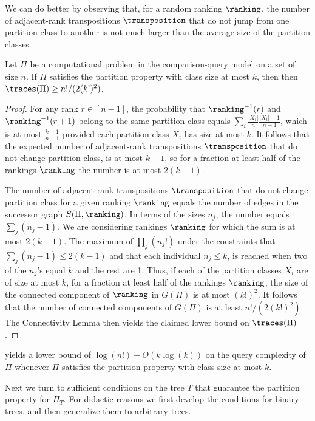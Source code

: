 We can do better by observing that, for a random ranking $\ranking$, the number of adjacent-rank transpositions $\transposition$ that do not jump from one partition class to another is not much larger than the average size of the partition classes.
\begin{lemma}\label{lemma:connectivity:sensitive}
Let $\Pi$ be a computational problem in the comparison-query model on a set of size $n$. If $\Pi$ satisfies the partition property with class size at most $k$, then then $\traces(\Pi) \ge n!/(2(k!)^2)$.
\end{lemma}
\begin{proof}
For any rank $r \in [n-1]$, the probability that $\ranking^{-1}(r)$ and $\ranking^{-1}(r+1)$ belong to the same partition class equals $\sum_i \frac{|X_i|}{n} \frac{|X_i|-1}{n-1}$, which is at most $\frac{k-1}{n-1}$ provided each partition class $X_i$ has size at most $k$. It follows that the expected number of adjacent-rank transpositions $\transposition$ that do not change partition class, is at most $k-1$, so for a fraction at least half of the rankings $\ranking$ the number is at most $2(k-1)$.

The number of adjacent-rank transpositions $\transposition$ that do not change partition class for a given ranking $\ranking$ equals the number of edges in the successor graph $S(\Pi,\ranking)$. In terms of the sizes $n_j$, the number equals $\sum_j (n_j-1)$. We are considering rankings $\ranking$ for which the sum is at most $2(k-1)$. The maximum of $\prod_j (n_j!)$ under the constraints that $\sum_j (n_j-1) \le 2(k-1)$ and that each individual $n_j \le k$, is reached when two of the $n_j$'s equal $k$ and the rest are 1. Thus, if each of the partition classes $X_i$ are of size at most $k$, for a fraction at least half of the rankings $\ranking$, the size of the connected component of $\ranking$ in $G(\Pi)$ is at most $(k!)^2$. It follows that the number of connected components of $G(\Pi)$ is at least $n!/(2(k!)^2)$. The Connectivity Lemma then yields the claimed lower bound on $\traces(\Pi)$.
\end{proof}

 yields a lower bound of $\log(n!) - O(k \log(k))$ on the query complexity of $\Pi$ whenever $\Pi$ satisfies the partition property with class size at most $k$. 

Next we turn to sufficient conditions on the tree $T$ that guarantee the partition property for $\Pi_T$. For didactic reasons we first develop the conditions for binary trees, and then generalize them to arbitrary trees.

